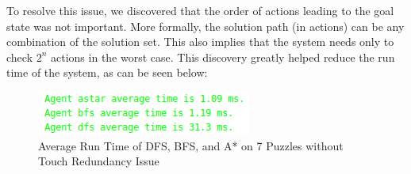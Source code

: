 To resolve this issue, we discovered that the order of actions leading to the goal state was not important. More formally, the solution path (in actions) can be any combination of the solution set. This also implies that the system needs only to check $2^n$ actions in the worst case. This discovery greatly helped reduce the run time of the system, as can be seen below:


\begin{figure}[H]
\includegraphics[width=0.75\linewidth]{assets/touch_redundancy_2.png}
\caption{Average Run Time of DFS, BFS, and A* on 7 Puzzles without Touch Redundancy Issue} \label{fig4}
\end{figure}